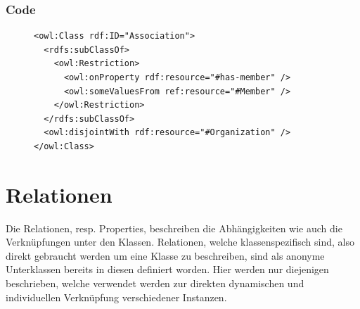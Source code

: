 \documentclass[
    11pt,
    latin1,
    a4paper,
    oneside
]{scrreprt}
\let\oldemph=\emph
\renewcommand{\emph}[1]{\index{#1}\oldemph{#1}}
\begin{document}
\subsubsection{Code} \label{sec:class_association_code}

\begin{figure}[H]
 \lstset{language=XML}
 \begin{lstlisting}[label=owl:association,caption={Eine \emph{Association} ist eine politische Partei oder eine andere Gesellschaft}]
<owl:Class rdf:ID="Association">
  <rdfs:subClassOf>
    <owl:Restriction>
      <owl:onProperty rdf:resource="#has-member" />
      <owl:someValuesFrom ref:resource="#Member" />
    </owl:Restriction>
  </rdfs:subClassOf>
  <owl:disjointWith rdf:resource="#Organization" />
</owl:Class>
 \end{lstlisting}
\end{figure}



\section{Relationen} \label{sec:relations}

Die Relationen, resp. Properties, beschreiben die Abh\"angigkeiten wie auch die Verkn\"upfungen unter den Klassen. Relationen, welche klassenspezifisch sind, also direkt gebraucht werden um eine Klasse zu beschreiben, sind als anonyme Unterklassen bereits in diesen definiert worden. Hier werden nur diejenigen beschrieben, welche verwendet werden zur direkten dynamischen und individuellen Verkn\"upfung verschiedener Instanzen.
\end{document}
